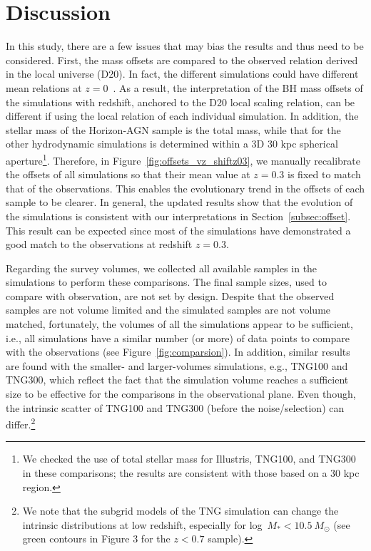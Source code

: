 \documentclass[twocolumn]{aastex631}
\def\smass{{$M_*$}}
\begin{document}
\section{Discussion} \label{sec:dis}
In this study, there are a few issues that may bias the results and thus need to be considered. First, the mass offsets are compared to the observed relation derived in the local universe (D20). In fact, the different simulations could have different mean relations at $z=0$~\citep[e.g.,][]{Habouzit2021}. As a result, the interpretation of the BH mass offsets of the simulations with redshift, anchored to the D20 local scaling relation, can be different if using the local relation of each individual simulation. In addition, the stellar mass of the Horizon-AGN sample is the total mass, while that for the other hydrodynamic simulations is determined within a 3D 30 kpc spherical aperture\footnote{We checked the use of total stellar mass for Illustris, TNG100, and TNG300 in these comparisons; the results are consistent with those based on a 30 kpc region.}. Therefore, in Figure~\ref{fig:offsets_vz_shiftz03}, we manually recalibrate the offsets of all simulations so that their mean value at $z=0.3$ is fixed to match that of the observations. This enables the evolutionary trend in the offsets of each sample to be clearer. In general, the updated results show that the evolution of the simulations is consistent with our interpretations in Section~\ref{subsec:offset}. This result can be expected since most of the simulations have demonstrated a good match to the observations at redshift $z=0.3$.

Regarding the survey volumes, we collected all available samples in the simulations to perform these comparisons. The final sample sizes, used to compare with observation, are not set by design. Despite that the observed samples are not volume limited and the simulated samples are not volume matched, fortunately, the volumes of all the simulations appear to be sufficient, i.e., all simulations have a similar number (or more) of data points to compare with the observations (see Figure~\ref{fig:comparsion}). In addition, similar results are found with the smaller- and larger-volumes simulations, e.g., TNG100 and TNG300, which reflect the fact that the simulation volume reaches a sufficient size to be effective for the comparisons in the observational plane. Even though, the intrinsic scatter of TNG100 and TNG300 (before the noise/selection) can differ.\footnote{We note that 
the subgrid models of the TNG simulation can change the intrinsic distributions at low redshift, especially for log~\smass$<10.5~M_{\odot}$ (see green contours in Figure 3 for the $z<0.7$ sample). }
\end{document}
